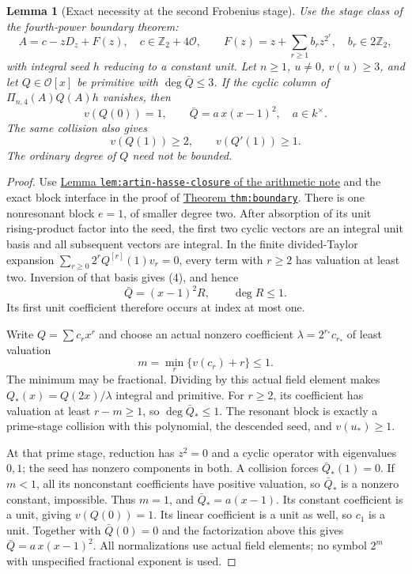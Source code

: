 \documentclass[11pt]{article}
\newtheorem{lemma}{Lemma}
\begin{document}
\begin{lemma}[Exact necessity at the second Frobenius stage]
\label{lem:stage-two-necessity}
Use the stage class of the fourth-power boundary theorem:
\[
 A=c-zD_z+F(z),\quad c\in\mathbb Z_2+4\mathcal O,\qquad
 F(z)=z+\sum_{r\ge1}b_rz^{2^r},\quad b_r\in2\mathbb Z_2,
\]
with integral seed $h$ reducing to a constant unit.
Let $n\ge1$, $u\ne0$, $v(u)\ge3$, and let
$Q\in\mathcal O[x]$ be primitive with $\deg\bar Q\le3$.
If the cyclic column of $\Pi_{n,4}(A)Q(A)h$ vanishes, then
\[
 v(Q(0))=1,\qquad \bar Q=a\,x(x-1)^2,\quad a\in k^\times. \tag{3}
\]
The same collision also gives
\[
 v(Q(1))\ge2,\qquad v(Q'(1))\ge1.                       \tag{4}
\]
The ordinary degree of $Q$ need not be bounded.
\end{lemma}
\begin{proof}
Use \href{ARITHMETIC_FRONTIER_TERMINAL_ORDERS.tex}{Lemma
\texttt{lem:artin-hasse-closure} of the arithmetic note}
and the exact block interface in the proof of
\href{LOWER_TWO_FOURTH_POWER_GAP_SFC.tex}{Theorem
\texttt{thm:boundary}}.
There is one nonresonant block $e=1$, of smaller degree two.
After absorption of its unit rising-product factor into the seed,
the first two cyclic vectors are an integral unit basis and all
subsequent vectors are integral.
In the finite divided-Taylor expansion
$\sum_{r\ge0}2^rQ^{[r]}(1)v_r=0$, every term with $r\ge2$
has valuation at least two.
Inversion of that basis gives (4), and hence
\[
 \bar Q=(x-1)^2R,\qquad \deg R\le1.
\]
Its first unit coefficient therefore occurs at index at most one.

Write $Q=\sum c_rx^r$ and choose an actual nonzero coefficient
$\lambda=2^{r_*}c_{r_*}$ of least valuation
\[
 m=\min_r\{v(c_r)+r\}\le1.
\]
The minimum may be fractional. Dividing by this actual field
element makes $Q_*(x)=Q(2x)/\lambda$ integral and primitive.
For $r\ge2$, its coefficient has valuation at least $r-m\ge1$,
so $\deg\bar Q_*\le1$.
The resonant block is exactly a prime-stage collision with this
polynomial, the descended seed, and $v(u_*)\ge1$.

At that prime stage, reduction has $z^2=0$ and a cyclic operator
with eigenvalues $0,1$; the seed has nonzero components in both.
A collision forces $\bar Q_*(1)=0$.
If $m<1$, all its nonconstant coefficients have positive valuation,
so $\bar Q_*$ is a nonzero constant, impossible.
Thus $m=1$, and $\bar Q_*=a(x-1)$.
Its constant coefficient is a unit, giving $v(Q(0))=1$.
Its linear coefficient is a unit as well, so $c_1$ is a unit.
Together with $\bar Q(0)=0$ and the factorization above this gives
$\bar Q=a\,x(x-1)^2$. All normalizations use actual field
elements; no symbol $2^m$ with unspecified fractional exponent is used.
\end{proof}
\end{document}
